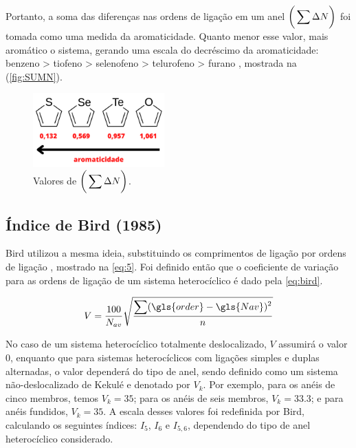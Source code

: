 Portanto, a soma das diferenças nas ordens de ligação em um anel $\bigg{(} \displaystyle \sum \Delta N \bigg{)}$ foi tomada como uma medida da aromaticidade. Quanto menor esse valor, mais aromático o sistema, gerando uma escala do decréscimo da aromaticidade: benzeno > tiofeno > selenofeno > telurofeno > furano \autocite{Fringuelli1974}, mostrada na (\autoref{fig:SUMN}). 

\begin{figure}[htb]
	\caption{\label{fig:SUMN} Valores de $\bigg{(} \displaystyle \sum \Delta N \bigg{)}$.}
	\begin{center}
		\includegraphics[width=0.45\textwidth]{images/aromaticity(1).png}
	\end{center}
\end{figure}


\subsection{Índice de Bird (1985)}

Bird \autocite{Bird1985, Bird1986, Bird1992} utilizou a mesma ideia, substituindo os comprimentos de ligação por ordens de ligação \autocite{Gordy1947}, mostrado na \autoref{eq:5}. Foi definido então que o coeficiente de variação para as ordens de ligação de um sistema heterocíclico é dado pela \autoref{eq:bird}.

\begin{figure}[htb]
    \vspace{1.0\baselineskip}
\begin{equation}
\label{eq:bird}
    V = \frac{100}{N_{av}} \sqrt{\displaystyle \frac{\displaystyle \sum (\gls{order} - \gls{Nav})^2}{n}}
\end{equation}
\end{figure}

No caso de um sistema heterocíclico totalmente deslocalizado, $V$ assumirá o valor 0, enquanto que para sistemas heterocíclicos com ligações simples e duplas alternadas, o valor dependerá do tipo de anel, sendo definido como um sistema não-deslocalizado de Kekulé e denotado por $V_k$. Por exemplo, para os anéis de cinco membros, temos $V_k = 35$; para os anéis de seis membros, $V_k = 33.3$; e para anéis fundidos, $V_k = 35$. A escala desses valores foi redefinida por Bird, calculando os seguintes índices: $I_5$, $I_6$ e $I_{5,6}$, dependendo do tipo de anel heterocíclico considerado.


